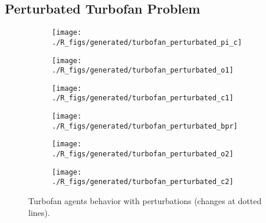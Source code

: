 \subsection{Perturbated Turbofan Problem}

\begin{figure*}
\centering

	\begin{subfigure}[b]{0.32\textwidth}
		\centering
		\texttt{[image: ./R\_figs/generated/turbofan\_perturbated\_pi\_c]}
		\label{turbofan_res_pert:pi_c}
	\end{subfigure}
	\begin{subfigure}[b]{0.32\textwidth}
		\centering
		\texttt{[image: ./R\_figs/generated/turbofan\_perturbated\_o1]}
		\label{turbofan_res_pert:o1}
	\end{subfigure}
	\begin{subfigure}[b]{0.32\textwidth}
		\centering
		\texttt{[image: ./R\_figs/generated/turbofan\_perturbated\_c1]}
		\label{turbofan_res_pert:c1}
	\end{subfigure}

	\begin{subfigure}[b]{0.32\textwidth}
		\centering
		\texttt{[image: ./R\_figs/generated/turbofan\_perturbated\_bpr]}
		\label{turbofan_res_pert:bpr}
	\end{subfigure}
	\begin{subfigure}[b]{0.32\textwidth}
		\centering
		\texttt{[image: ./R\_figs/generated/turbofan\_perturbated\_o2]}
		\label{turbofan_res_pert:o2}
	\end{subfigure}
	\begin{subfigure}[b]{0.32\textwidth}
		\centering
		\texttt{[image: ./R\_figs/generated/turbofan\_perturbated\_c2]}
		\label{turbofan_res_pert:c2}
	\end{subfigure}
	
	\caption{Turbofan agents behavior with perturbations (changes at dotted lines).}
	\label{turbofan_res_pert}
\end{figure*}


